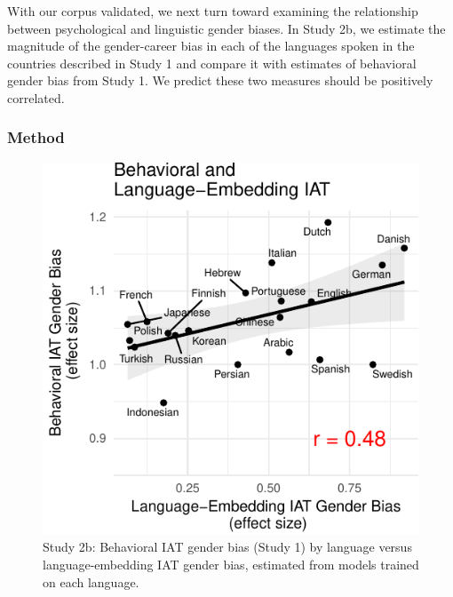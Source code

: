 \documentclass[10pt, letterpaper]{article}
\newenvironment{CodeChunk}{}{}
\begin{document}
With our corpus validated, we next turn toward examining the
relationship between psychological and linguistic gender biases. In
Study 2b, we estimate the magnitude of the gender-career bias in each of
the languages spoken in the countries described in Study 1 and compare
it with estimates of behavioral gender bias from Study 1. We predict
these two measures should be positively correlated.

\subsubsection{Method}\label{method-2}

\begin{CodeChunk}
\begin{figure}[t]

{\centering \includegraphics{figs/behavior_vs_language_plot-1} 

}

\caption[Study 2b]{Study 2b: Behavioral IAT gender bias (Study 1) by language versus language-embedding IAT gender bias, estimated from models trained on each language.}\label{fig:behavior_vs_language_plot}
\end{figure}
\end{CodeChunk}
\end{document}
